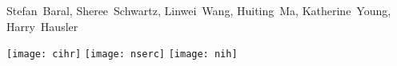 \begin{center}\small
  {Stefan~Baral},
  {Sheree~Schwartz},
  {Linwei~Wang},
  {Huiting~Ma},
  {Katherine~Young},
  {Harry~Hausler}
\end{center}
\begin{center}
  \texttt{[image: cihr]}
  \hspace{1em}
  \texttt{[image: nserc]}
  \hspace{1em}
  \texttt{[image: nih]}
\end{center}
